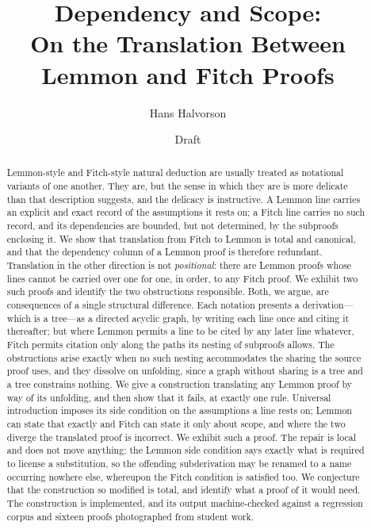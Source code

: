 \documentclass[11pt]{article}
\title{Dependency and Scope:\\
       On the Translation Between Lemmon and Fitch Proofs}
\author{Hans Halvorson}
\date{Draft}
\theoremstyle{plain}
\theoremstyle{definition}
\theoremstyle{remark}
\begin{document}
\maketitle

\begin{abstract}
Lemmon-style and Fitch-style natural deduction are usually treated as
notational variants of one another. They are, but the sense in which they are
is more delicate than that description suggests, and the delicacy is
instructive. A Lemmon line carries an explicit and exact record of the
assumptions it rests on; a Fitch line carries no such record, and its
dependencies are bounded, but not determined, by the subproofs enclosing it.
We show that translation from Fitch to Lemmon is total and canonical, and that
the dependency column of a Lemmon proof is therefore redundant. Translation in
the other direction is not \emph{positional}: there are Lemmon proofs whose
lines cannot be carried over one for one, in order, to any Fitch proof. We exhibit two such proofs and
identify the two obstructions responsible. Both, we argue, are consequences of
a single structural difference. Each notation presents a derivation---which is
a tree---as a directed acyclic graph, by writing each line once and citing it
thereafter; but where Lemmon permits a line to be cited by any later line
whatever, Fitch permits citation only along the paths its nesting of subproofs
allows. The obstructions arise exactly when no such nesting accommodates the
sharing the source proof uses, and they dissolve on unfolding, since a graph
without sharing is a tree and a tree constrains nothing. We give a
construction translating any Lemmon proof by way of its unfolding, and then
show that it fails, at exactly one rule. Universal introduction imposes its
side condition on the assumptions a line rests on; Lemmon can state that
exactly and Fitch can state it only about scope, and where the two diverge the
translated proof is incorrect. We exhibit such a proof. The repair is local
and does not move anything: the Lemmon side condition says exactly what is
required to license a substitution, so the offending subderivation may be
renamed to a name occurring nowhere else, whereupon the Fitch condition is
satisfied too. We conjecture that the construction so modified is total, and
identify what a proof of it would need. The construction is implemented, and
its output machine-checked against a regression corpus and sixteen proofs
photographed from student work.
\end{abstract}
\end{document}
